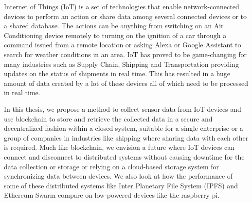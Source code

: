 \documentclass[11pt,openright]{report}
\begin{document}
\thesistitlepage
\clearpage
\copyrightpage

\newpage


\begin{thesisabstract}

Internet of Things (IoT) is a set of technologies that enable network-connected devices to perform an action or share data among several connected devices or to a shared database. The actions can be anything from switching on an Air Conditioning device remotely to turning on the ignition of a car through a command issued from a remote location or asking Alexa or Google Assistant to search for weather conditions in an area. IoT has proved to be game-changing for many industries such as Supply Chain, Shipping and Transportation providing updates on the status of shipments in real time. This has resulted in a huge amount of data created by a lot of these devices all of which need to be processed in real time. 

In this thesis, we propose a method to collect sensor data from IoT devices and use blockchain to store and retrieve the collected data in a secure and decentralized fashion within a closed system, suitable for a single enterprise or a group of companies in industries like shipping where sharing data with each other is required. Much like blockchain, we envision a future where IoT devices can connect and disconnect to distributed systems without causing downtime for the data collection or storage or relying on a cloud-based storage system for synchronizing data between devices. We also look at how the performance of some of these distributed systems like Inter Planetary File System (IPFS) and Ethereum Swarm compare on low-powered devices like the raspberry pi.

\end{thesisabstract}


\end{document}
